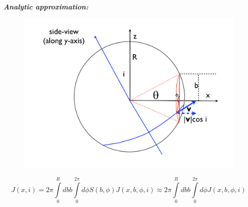 \documentclass{beamer}
\begin{document}
\begin{frame}{\textit{\textbf{Analytic approximation:}}}
\begin{figure}
\includegraphics[scale=0.2]{Figures/fig11a.pdf}
\end{figure}


\begin{equation}
J(x, i) = 2\pi \int \limits_0^R db b \int \limits_0^{2\pi}d\phi S(b,\phi)J(x, b, \phi, i) \approx 2\pi \int \limits_0^R db b \int \limits_0^{2\pi}d\phi J(x, b, \phi, i)
\end{equation}
\end{frame}



\end{document}
